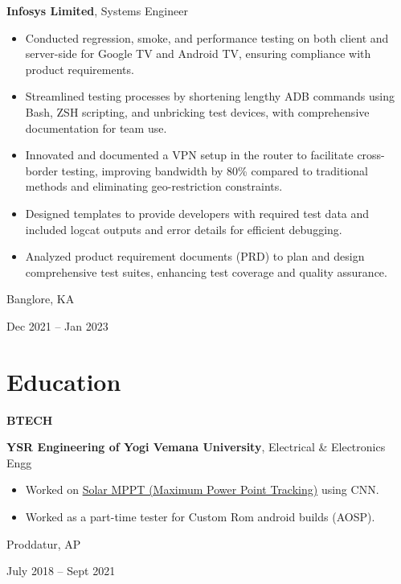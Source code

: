 \documentclass[10pt, letterpaper]{article}
\newenvironment{highlights}{
    \begin{itemize}[
        topsep=0.10 cm,
        parsep=0.10 cm,
        partopsep=0pt,
        itemsep=0pt,
        leftmargin=0.4 cm + 10pt
    ]
}{
    \end{itemize}
} %
\newenvironment{twocolentry}[2][]{
    \onecolentry
    \def\secondColumn{#2}
    \setcolumnwidth{\fill, 4.5 cm}
    \begin{paracol}{2}
}{
    \switchcolumn \raggedleft \secondColumn
    \end{paracol}
    \endonecolentry
} %
\newenvironment{threecolentry}[3][]{
    \onecolentry
    \def\thirdColumn{#3}
    \setcolumnwidth{1 cm, \fill, 4.5 cm}
    \begin{paracol}{3}
    {\raggedright #2} \switchcolumn
}{
    \switchcolumn \raggedleft \thirdColumn
    \end{paracol}
    \endonecolentry
} %
\begin{document}
        \begin{twocolentry}{
            Banglore, KA

        Dec 2021 – Jan 2023
        }
            \textbf{Infosys Limited}, Systems Engineer
            \begin{highlights}
                \item Conducted regression, smoke, and performance testing on both client and server-side for Google TV and Android TV, ensuring compliance with product requirements.
                \item Streamlined testing processes by shortening lengthy ADB commands using Bash, ZSH scripting, and unbricking test devices, with comprehensive documentation for team use.
                \item Innovated and documented a VPN setup in the router to facilitate cross-border testing,  improving bandwidth by 80\% compared to traditional methods and eliminating geo-restriction constraints.
                \item Designed templates to provide developers with required test data and included logcat outputs and error details for efficient debugging.
                \item Analyzed product requirement documents (PRD) to plan and design comprehensive test suites, enhancing test coverage and quality assurance.
            \end{highlights}
        \end{twocolentry}



    
    \section{Education}



        
        \begin{threecolentry}{\textbf{BTECH}}{
            Proddatur, AP

        July 2018 – Sept 2021
        }
            \textbf{YSR Engineering of Yogi Vemana University}, Electrical \& Electronics Engg
            \begin{highlights}
                \item Worked on \href{https://www.nfedconferences.org/proceedings/IC-GRPETHR\%202021.pdf\#page=57}{Solar MPPT (Maximum Power Point Tracking)} using CNN.
                \item Worked as a part-time tester for Custom Rom android builds (AOSP).
            \end{highlights}
        \end{threecolentry}
\end{document}
